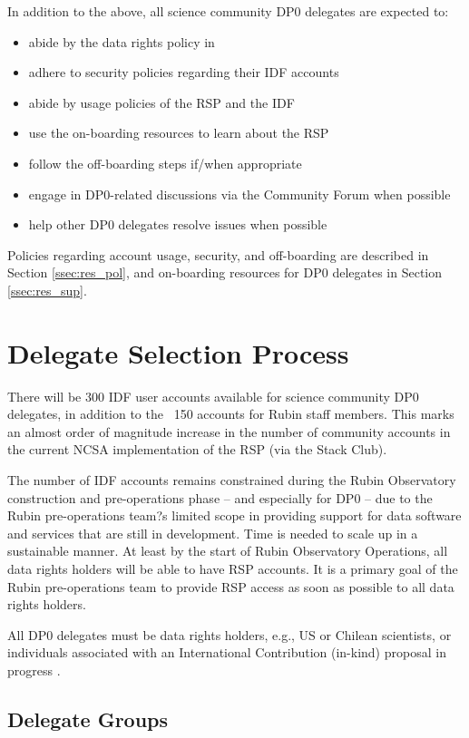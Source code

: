 \documentclass[DM,authoryear,toc]{lsstdoc}
\begin{document}
In addition to the above, all science community DP0 delegates are expected to:
\begin{itemize}
\item abide by the data rights policy in \cite{RDO-013}
\item adhere to security policies regarding their IDF accounts
\item abide by usage policies of the RSP and the IDF
\item use the on-boarding resources to learn about the RSP
\item follow the off-boarding steps if/when appropriate
\item engage in DP0-related discussions via the Community Forum when possible
\item help other DP0 delegates resolve issues when possible
\end{itemize}

Policies regarding account usage, security, and off-boarding are described in Section \ref{ssec:res_pol}, and on-boarding resources for DP0 delegates in Section \ref{ssec:res_sup}. 


\section{Delegate Selection Process}\label{sec:sel}

There will be 300 IDF user accounts available for science community DP0 delegates, in addition to the ~150 accounts for Rubin staff members.
This marks an almost order of magnitude increase in the number of community accounts in the current NCSA implementation of the RSP (via the Stack Club).

The number of IDF accounts remains constrained during the Rubin Observatory construction and pre-operations phase -- and especially for DP0 -- due to the Rubin pre-operations team?s limited scope in providing support for data software and services that are still in development.
Time is needed to scale up in a sustainable manner.
At least by the start of Rubin Observatory Operations, all data rights holders will be able to have RSP accounts.
It is a primary goal of the Rubin pre-operations team to provide RSP access as soon as possible to all data rights holders. 

All DP0 delegates must be data rights holders, e.g., US or Chilean scientists, or individuals associated with an International Contribution (in-kind) proposal in progress \cite{RDO-013}.

\subsection{Delegate Groups}\label{ssec:sel_grps}
\end{document}
